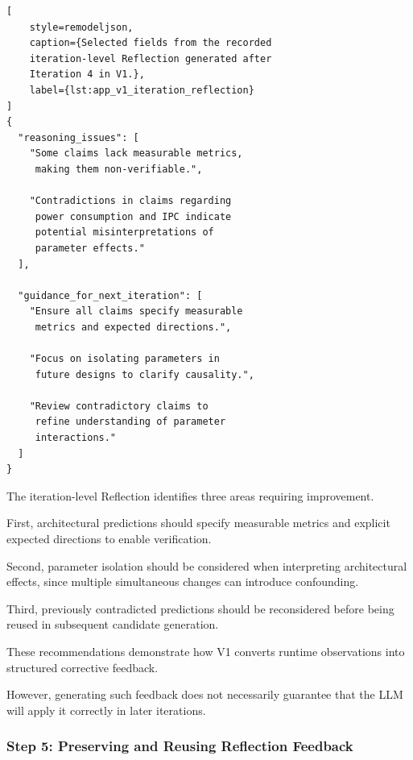\begin{lstlisting}[
    style=remodeljson,
    caption={Selected fields from the recorded
    iteration-level Reflection generated after
    Iteration 4 in V1.},   
    label={lst:app_v1_iteration_reflection}
]
{
  "reasoning_issues": [
    "Some claims lack measurable metrics,
     making them non-verifiable.",

    "Contradictions in claims regarding
     power consumption and IPC indicate
     potential misinterpretations of
     parameter effects."
  ],

  "guidance_for_next_iteration": [
    "Ensure all claims specify measurable
     metrics and expected directions.",

    "Focus on isolating parameters in
     future designs to clarify causality.",

    "Review contradictory claims to
     refine understanding of parameter
     interactions."
  ]
}
\end{lstlisting}

The iteration-level Reflection identifies
three areas requiring improvement.

First, architectural predictions should
specify measurable metrics and explicit
expected directions to enable verification.

Second, parameter isolation should be
considered when interpreting architectural
effects, since multiple simultaneous changes
can introduce confounding.

Third, previously contradicted predictions
should be reconsidered before being reused
in subsequent candidate generation.

These recommendations demonstrate how V1
converts runtime observations into
structured corrective feedback.

However, generating such feedback does
not necessarily guarantee that the LLM
will apply it correctly in later iterations.






\subsubsection{Step 5: Preserving and Reusing Reflection Feedback}

